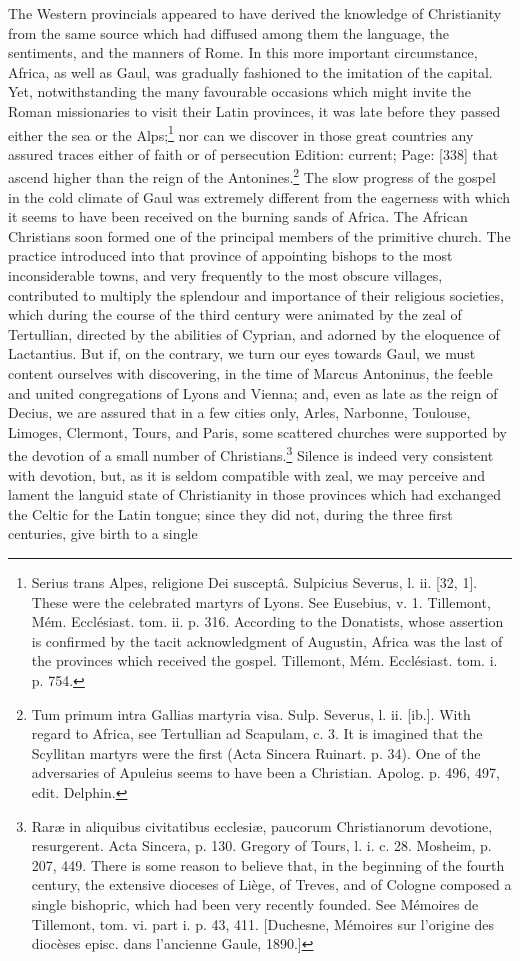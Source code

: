 The Western provincials appeared to have derived the knowledge of Christianity from the same source which had diffused among them the language, the sentiments, and the manners of Rome. In this more important circumstance, Africa, as well as Gaul, was gradually fashioned to the imitation of the capital. Yet, notwithstanding the many favourable occasions which might invite the Roman missionaries to visit their Latin provinces, it was late before they passed either the sea or the Alps;\footnote{Serius trans Alpes, religione Dei susceptâ. Sulpicius Severus, l. ii. [32, 1]. These were the celebrated martyrs of Lyons. See Eusebius, v. 1. Tillemont, Mém. Ecclésiast. tom. ii. p. 316. According to the Donatists, whose assertion is confirmed by the tacit acknowledgment of Augustin, Africa was the last of the provinces which received the gospel. Tillemont, Mém. Ecclésiast. tom. i. p. 754.} nor can we discover in those great countries any assured traces either of faith or of persecution Edition: current; Page: [338] that ascend higher than the reign of the Antonines.\footnote{Tum primum intra Gallias martyria visa. Sulp. Severus, l. ii. [ib.]. With regard to Africa, see Tertullian ad Scapulam, c. 3. It is imagined that the Scyllitan martyrs were the first (Acta Sincera Ruinart. p. 34). One of the adversaries of Apuleius seems to have been a Christian. Apolog. p. 496, 497, edit. Delphin.} The slow progress of the gospel in the cold climate of Gaul was extremely different from the eagerness with which it seems to have been received on the burning sands of Africa. The African Christians soon formed one of the principal members of the primitive church. The practice introduced into that province of appointing bishops to the most inconsiderable towns, and very frequently to the most obscure villages, contributed to multiply the splendour and importance of their religious societies, which during the course of the third century were animated by the zeal of Tertullian, directed by the abilities of Cyprian, and adorned by the eloquence of Lactantius. But if, on the contrary, we turn our eyes towards Gaul, we must content ourselves with discovering, in the time of Marcus Antoninus, the feeble and united congregations of Lyons and Vienna; and, even as late as the reign of Decius, we are assured that in a few cities only, Arles, Narbonne, Toulouse, Limoges, Clermont, Tours, and Paris, some scattered churches were supported by the devotion of a small number of Christians.\footnote{Raræ in aliquibus civitatibus ecclesiæ, paucorum Christianorum devotione, resurgerent. Acta Sincera, p. 130. Gregory of Tours, l. i. c. 28. Mosheim, p. 207, 449. There is some reason to believe that, in the beginning of the fourth century, the extensive dioceses of Liège, of Treves, and of Cologne composed a single bishopric, which had been very recently founded. See Mémoires de Tillemont, tom. vi. part i. p. 43, 411. [Duchesne, Mémoires sur l\texthebrew{}’origine des diocèses episc. dans l\texthebrew{}’ancienne Gaule, 1890.]} Silence is indeed very consistent with devotion, but, as it is seldom compatible with zeal, we may perceive and lament the languid state of Christianity in those provinces which had exchanged the Celtic for the Latin tongue; since they did not, during the three first centuries, give birth to a single 